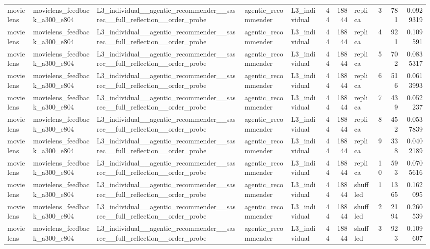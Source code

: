 \begin{table}[htbp!]
\begin{tabular}{lllllrrlrrr}
movielens & movielens\_feedback\_a300\_e804 & L3\_individual\_\_agentic\_recommender\_\_sasrec\_\_full\_reflection\_\_order\_probe & agentic\_recommender & L3\_individual & 44 & 18844 & replica & 3 & 781 & 0.0929319 \\
movielens & movielens\_feedback\_a300\_e804 & L3\_individual\_\_agentic\_recommender\_\_sasrec\_\_full\_reflection\_\_order\_probe & agentic\_recommender & L3\_individual & 44 & 18844 & replica & 4 & 921 & 0.109591 \\
movielens & movielens\_feedback\_a300\_e804 & L3\_individual\_\_agentic\_recommender\_\_sasrec\_\_full\_reflection\_\_order\_probe & agentic\_recommender & L3\_individual & 44 & 18844 & replica & 5 & 702 & 0.0835317 \\
movielens & movielens\_feedback\_a300\_e804 & L3\_individual\_\_agentic\_recommender\_\_sasrec\_\_full\_reflection\_\_order\_probe & agentic\_recommender & L3\_individual & 44 & 18844 & replica & 6 & 516 & 0.0613993 \\
movielens & movielens\_feedback\_a300\_e804 & L3\_individual\_\_agentic\_recommender\_\_sasrec\_\_full\_reflection\_\_order\_probe & agentic\_recommender & L3\_individual & 44 & 18844 & replica & 7 & 439 & 0.052237 \\
movielens & movielens\_feedback\_a300\_e804 & L3\_individual\_\_agentic\_recommender\_\_sasrec\_\_full\_reflection\_\_order\_probe & agentic\_recommender & L3\_individual & 44 & 18844 & replica & 8 & 452 & 0.0537839 \\
movielens & movielens\_feedback\_a300\_e804 & L3\_individual\_\_agentic\_recommender\_\_sasrec\_\_full\_reflection\_\_order\_probe & agentic\_recommender & L3\_individual & 44 & 18844 & replica & 9 & 338 & 0.0402189 \\
movielens & movielens\_feedback\_a300\_e804 & L3\_individual\_\_agentic\_recommender\_\_sasrec\_\_full\_reflection\_\_order\_probe & agentic\_recommender & L3\_individual & 44 & 18844 & replica & 10 & 593 & 0.0705616 \\
movielens & movielens\_feedback\_a300\_e804 & L3\_individual\_\_agentic\_recommender\_\_sasrec\_\_full\_reflection\_\_order\_probe & agentic\_recommender & L3\_individual & 44 & 18844 & shuffled & 1 & 1365 & 0.162095 \\
movielens & movielens\_feedback\_a300\_e804 & L3\_individual\_\_agentic\_recommender\_\_sasrec\_\_full\_reflection\_\_order\_probe & agentic\_recommender & L3\_individual & 44 & 18844 & shuffled & 2 & 2194 & 0.260539 \\
movielens & movielens\_feedback\_a300\_e804 & L3\_individual\_\_agentic\_recommender\_\_sasrec\_\_full\_reflection\_\_order\_probe & agentic\_recommender & L3\_individual & 44 & 18844 & shuffled & 3 & 923 & 0.109607 \\

\end{tabular}
\end{table}
